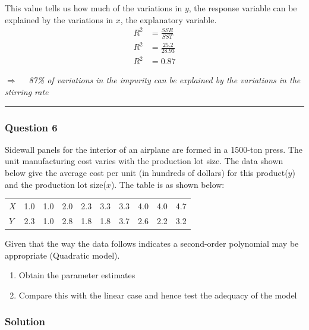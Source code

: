 \documentclass[
]{article}
\providecommand{\tightlist}{%
  \setlength{\itemsep}{0pt}\setlength{\parskip}{0pt}}
\begin{document}
This value tells us how much of the variations in \(y\), the response
variable can be explained by the variations in \(x\), the explanatory
variable. \begin{align*}
    R^2 & = \frac {SSR}{SST} \\
    R^2 & = \frac{25.2}{28.93} \\
    R^2 & = 0.87
  \end{align*}

\(\Rightarrow \quad\) \emph{87\% of variations in the impurity can be
explained by the variations in the stirring rate}

\begin{center}\rule{0.5\linewidth}{0.5pt}\end{center}

\subsubsection{Question 6}\label{question-6}

Sidewall panels for the interior of an airplane are formed in a 1500-ton
press. The unit manufacturing cost varies with the production lot size.
The data shown below give the average cost per unit (in hundreds of
dollars) for this product(\(y\)) and the production lot size(\(x\)). The
table is as shown below:

\begin{longtable}[]{@{}llllllllll@{}}
\toprule\noalign{}
\endhead
\bottomrule\noalign{}
\endlastfoot
\(X\) & 1.0 & 1.0 & 2.0 & 2.3 & 3.3 & 3.3 & 4.0 & 4.0 & 4.7 \\
\(Y\) & 2.3 & 1.0 & 2.8 & 1.8 & 1.8 & 3.7 & 2.6 & 2.2 & 3.2 \\
\end{longtable}

Given that the way the data follows indicates a second-order polynomial
may be appropriate (Quadratic model).

\begin{enumerate}
\def\labelenumi{\alph{enumi}.}
\tightlist
\item
  Obtain the parameter estimates
\item
  Compare this with the linear case and hence test the adequacy of the
  model
\end{enumerate}

\subsubsection{Solution}\label{solution-5}
\end{document}

